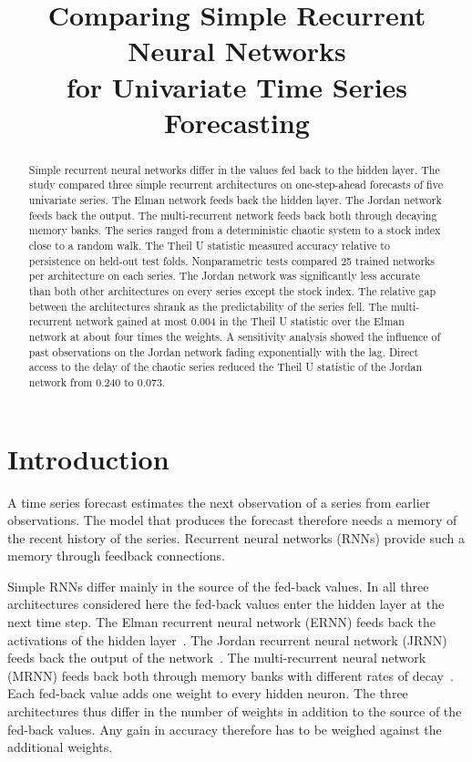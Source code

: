 \documentclass[conference,10pt]{IEEEtran}
\begin{document}
\title{Comparing Simple Recurrent Neural Networks\\
for Univariate Time Series Forecasting}

\author{
}

\maketitle

\begin{abstract}
Simple recurrent neural networks differ in the values fed back to the
hidden layer.
The study compared three simple recurrent architectures on
one-step-ahead forecasts of five univariate series.
The Elman network feeds back the hidden layer.
The Jordan network feeds back the output.
The multi-recurrent network feeds back both through decaying memory
banks.
The series ranged from a deterministic chaotic system to a stock index
close to a random walk.
The Theil U statistic measured accuracy relative to persistence on
held-out test folds.
Nonparametric tests compared 25 trained networks per architecture on
each series.
The Jordan network was significantly less accurate than both other
architectures on every series except the stock index.
The relative gap between the architectures shrank as the predictability
of the series fell.
The multi-recurrent network gained at most 0.004 in the Theil U
statistic over the Elman network at about four times the weights.
A sensitivity analysis showed the influence of past observations on the
Jordan network fading exponentially with the lag.
Direct access to the delay of the chaotic series reduced the Theil U
statistic of the Jordan network from 0.240 to 0.073.
\end{abstract}

\section{Introduction}
\label{sec:introduction}
A time series forecast estimates the next observation of a series from
earlier observations.
The model that produces the forecast therefore needs a memory of the
recent history of the series.
Recurrent neural networks (RNNs) provide such a memory through feedback
connections.

Simple RNNs differ mainly in the source of the fed-back values.
In all three architectures considered here the fed-back values enter
the hidden layer at the next time step.
The Elman recurrent neural network (ERNN) feeds back the activations of
the hidden layer~\cite{elman1990}.
The Jordan recurrent neural network (JRNN) feeds back the output of the
network~\cite{jordan1986}.
The multi-recurrent neural network (MRNN) feeds back both through memory
banks with different rates of decay~\cite{ulbricht1994}.
Each fed-back value adds one weight to every hidden neuron.
The three architectures thus differ in the number of weights in addition
to the source of the fed-back values.
Any gain in accuracy therefore has to be weighed against the additional
weights.
\end{document}
